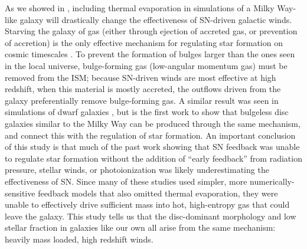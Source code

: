 As we showed in \citet{Keller2015}, including thermal evaporation in simulations
of a Milky Way-like galaxy will drastically change the effectiveness of
SN-driven galactic winds.  Starving the galaxy of gas (either through ejection
of accreted gas, or prevention of accretion) is the only effective mechanism for
regulating star formation on cosmic timescales \citep{Keres2009}.  To prevent
the formation of bulges larger than the ones seen in the local universe,
bulge-forming gas (low-angular momentum gas) must be removed from the ISM;
because SN-driven winds are most effective at high redshift, when this material
is mostly accreted, the outflows driven from the galaxy preferentially remove
bulge-forming gas.  A similar result was seen in simulations of dwarf galaxies
\citep{Governato2010, Brook2011}, but \citet{Keller2015} is the first work to
show that bulgeless disc galaxies similar to the Milky Way can be produced
through the same mechanism, and connect this with the regulation of star
formation.  An important conclusion of this study is that much of the past work
\citep{Stinson2013,Agertz2013,Hopkins2014} showing that SN feedback was unable
to regulate star formation without the addition of ``early feedback'' from
radiation pressure, stellar winds, or photoionization was likely underestimating
the effectiveness of SN.  Since many of these studies used simpler, more
numerically-sensitive feedback models that also omitted thermal evaporation,
they were unable to effectively drive sufficient mass into hot, high-entropy gas
that could leave the galaxy.  This study tells us that the disc-dominant
morphology and low stellar fraction in galaxies like our own all arise from the
same mechanism:  heavily mass loaded, high redshift winds.

